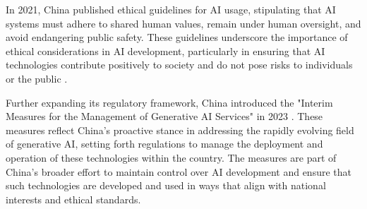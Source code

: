 In 2021, China published ethical guidelines for AI usage, stipulating that AI systems must adhere to shared human values, remain under human oversight, and avoid endangering public safety. These guidelines underscore the importance of ethical considerations in AI development, particularly in ensuring that AI technologies contribute positively to society and do not pose risks to individuals or the public \cite{cset_ethical_norms_2021}.

Further expanding its regulatory framework, China introduced the "Interim Measures for the Management of Generative AI Services" in 2023 \cite{fortune_china_ai_2023}. These measures reflect China's proactive stance in addressing the rapidly evolving field of generative AI, setting forth regulations to manage the deployment and operation of these technologies within the country. The measures are part of China's broader effort to maintain control over AI development and ensure that such technologies are developed and used in ways that align with national interests and ethical standards.
